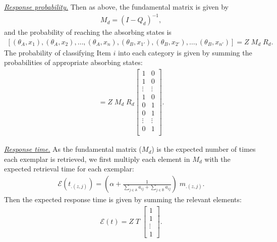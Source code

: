 \documentclass[doc]{apa6}
\newcommand{\subsubsubsection}[1]{\textit{\underline{#1}}}
\begin{document}
\subsubsubsection{Response probability.} Then as above, the fundamental matrix is given by
\begin{align}
    M_{d} = {\left(I - Q_{d} \right)}^{-1},
\end{align}
and the probability of reaching the absorbing states is
\begin{align}
    \left[(\theta_{A}, x_{1}),  (\theta_{A}, x_{2}),  \ldots, (\theta_{A}, x_{n}),
        (\theta_{B}, x_{1'}), (\theta_{B}, x_{2'}), \ldots, (\theta_{B}, x_{n'})\right]
    = Z \; M_{d} \; R_{d}.
\end{align}
The probability of classifying Item $i$ into each category is given by summing the probabilities of
appropriate absorbing states:
\begin{align}
    [p(\mathbb{A}), \; p(\mathbb{B})] =
        Z \; M_{d} \; R_{d}
        \left[
            \begin{array}{cc}
                1      & 0      \\
                1      & 0      \\
                \vdots & \vdots \\
                1      & 0      \\
                0      & 1      \\
                0      & 1      \\
                \vdots & \vdots \\
                0      & 1      \\
            \end{array}
        \right].
\end{align}

\subsubsubsection{Response time.} As the fundamental matrix ($M_{d}$) is the expected number of times each exemplar is retrieved, we first multiply each element in $M_{d}$ with the expected retrieval time for each exemplar:
\begin{align}
    \mathcal{E}(t_{.(z, j)}) = \left( \alpha + \frac{1}
                                                    {\sum_{j \in \mathbb{A}} a_{ij} + \sum_{j \in \mathbb{B}} a_{ij}}
                               \right) \; m_{.(z, j)}.
\end{align}
Then the expected response time is given by summing the relevant elements:
\begin{align}
    \mathcal{E}(t) = Z \; T \; \left[ \begin{array}{c} 1 \\ 1 \\ \vdots \\ 1 \end{array} \right].
\end{align}
\end{document}
